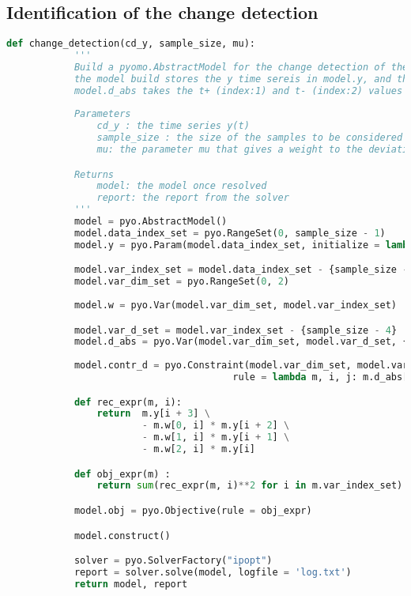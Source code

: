 \documentclass[11pt]{article}
\begin{document}
    \subsection{Identification of the change detection}
    \label{appendix: pyomo and Ipopt}
        \begin{lstlisting}[language=Python]
            def change_detection(cd_y, sample_size, mu):
            '''
            Build a pyomo.AbstractModel for the change detection of the parameters.
            the model build stores the y time sereis in model.y, and the time series of the parameters a, b, and c in a 3 column time series model.w.
            model.d_abs takes the t+ (index:1) and t- (index:2) values for the modeling of the absolute value of the variation of the parameters.
            
            Parameters
                cd_y : the time series y(t)
                sample_size : the size of the samples to be considered
                mu: the parameter mu that gives a weight to the deviation cost.

            Returns
                model: the model once resolved
                report: the report from the solver    
            '''
            model = pyo.AbstractModel()
            model.data_index_set = pyo.RangeSet(0, sample_size - 1)
            model.y = pyo.Param(model.data_index_set, initialize = lambda _, i: cd_y[i])

            model.var_index_set = model.data_index_set - {sample_size - 1, sample_size - 2, sample_size - 3}
            model.var_dim_set = pyo.RangeSet(0, 2)
            
            model.w = pyo.Var(model.var_dim_set, model.var_index_set)

            model.var_d_set = model.var_index_set - {sample_size - 4}
            model.d_abs = pyo.Var(model.var_dim_set, model.var_d_set, {1 , 2}, domain = pyo.NonNegativeReals)
            
            model.contr_d = pyo.Constraint(model.var_dim_set, model.var_d_set,
                                        rule = lambda m, i, j: m.d_abs[i, j, 2] - m.d_abs[i, j, 1]  == m.w[i, j + 1] - m.w[i, j])

            def rec_expr(m, i):
                return  m.y[i + 3] \
                        - m.w[0, i] * m.y[i + 2] \
                        - m.w[1, i] * m.y[i + 1] \
                        - m.w[2, i] * m.y[i]

            def obj_expr(m) :
                return sum(rec_expr(m, i)**2 for i in m.var_index_set) + mu * pyo.summation(m.d_abs)

            model.obj = pyo.Objective(rule = obj_expr)

            model.construct()

            solver = pyo.SolverFactory("ipopt")
            report = solver.solve(model, logfile = 'log.txt')
            return model, report       
        \end{lstlisting}
\end{document}
